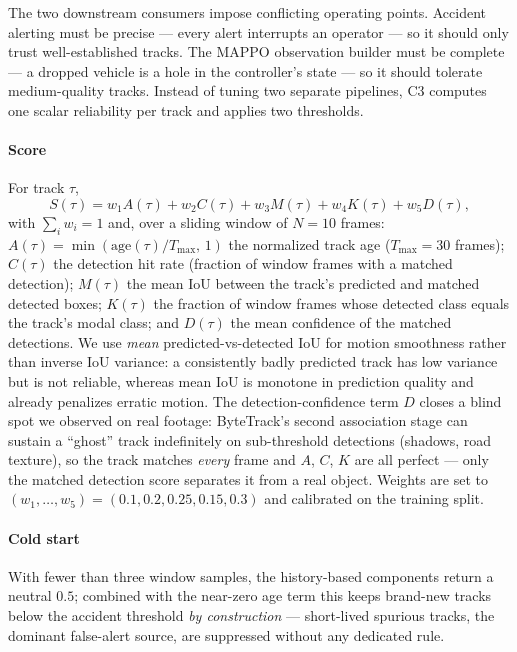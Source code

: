 The two downstream consumers impose conflicting operating points.
Accident alerting must be precise --- every alert interrupts an
operator --- so it should only trust well-established tracks.
The MAPPO observation builder must be complete --- a dropped vehicle is
a hole in the controller's state --- so it should tolerate
medium-quality tracks.
Instead of tuning two separate pipelines, C3 computes one scalar
reliability per track and applies two thresholds.

\paragraph{Score}
For track $\tau$,
\begin{equation}
  S(\tau) = w_1 A(\tau) + w_2 C(\tau) + w_3 M(\tau) + w_4 K(\tau)
          + w_5 D(\tau),
  \label{eq:reliability}
\end{equation}
with $\sum_i w_i = 1$ and, over a sliding window of $N{=}10$ frames:
$A(\tau) = \min(\mathrm{age}(\tau)/T_{\max},\,1)$ the normalized track
age ($T_{\max} = 30$ frames);
$C(\tau)$ the detection hit rate (fraction of window frames with a
matched detection);
$M(\tau)$ the mean IoU between the track's predicted and matched
detected boxes;
$K(\tau)$ the fraction of window frames whose detected class equals the
track's modal class; and
$D(\tau)$ the mean confidence of the matched detections.
We use \emph{mean} predicted-vs-detected IoU for motion smoothness
rather than inverse IoU variance: a consistently badly predicted track
has low variance but is not reliable, whereas mean IoU is monotone in
prediction quality and already penalizes erratic motion.
The detection-confidence term $D$ closes a blind spot we observed on
real footage: ByteTrack's second association stage can sustain a
``ghost'' track indefinitely on sub-threshold detections (shadows, road
texture), so the track matches \emph{every} frame and $A$, $C$, $K$ are
all perfect --- only the matched detection score separates it from a
real object.
Weights are set to $(w_1,\dots,w_5) = (0.1, 0.2, 0.25, 0.15, 0.3)$
and calibrated on the training split.

\paragraph{Cold start}
With fewer than three window samples, the history-based components
return a neutral $0.5$; combined with the near-zero age term this keeps
brand-new tracks below the accident threshold \emph{by construction} ---
short-lived spurious tracks, the dominant false-alert source, are
suppressed without any dedicated rule.


